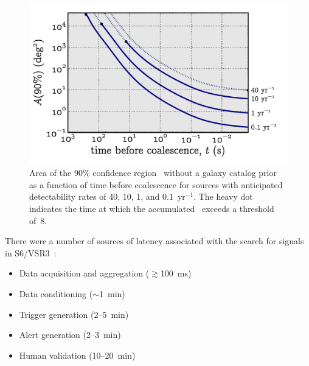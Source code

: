 \documentclass[portrait,plainboxedsections]{sciposter}
\begin{document}
\begin{minipage}[t]{0.25\textwidth}
\begin{figure}[h]
\includegraphics[width=1.15\textwidth]{figures/loc_in_time}
\caption{\label{fig:sky-localization-accuracy}Area of the 90\% confidence
region~\citep{Fairhurst2009} without a galaxy catalog prior as a function of time before coalescence for sources with anticipated
detectability rates of 40, 10, 1, and 0.1~yr$^{-1}$. The heavy dot indicates
the time at which the accumulated \SNR\ exceeds a threshold of~8.}
\end{figure}

There were a number of sources of latency associated with the search for
\CBC{} signals in S6/VSR3~\citep{HugheyGWPAW2011}:

\begin{itemize}
\item Data acquisition and aggregation ($\gtrsim$100~ms)

\item Data conditioning ($\sim$1~min)

\item Trigger generation (2--5~min)

\item Alert generation (2--3~min)

\item Human validation (10--20~min)

\end{itemize}

\end{minipage}%
\hspace{0.05\textwidth}%
\end{document}
